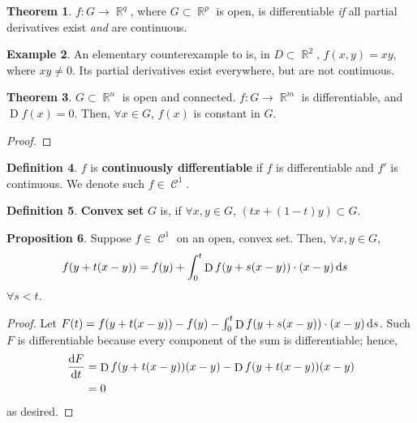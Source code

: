 \documentclass{amsart} %
\theoremstyle{mytheoremstyle}
\theoremstyle{definition}
\newtheorem{definition}{Definition}[section]
\newtheorem{proposition}[definition]{Proposition}
\newtheorem{theorem}[definition]{Theorem}
\newtheorem{example}[definition]{Example}
\numberwithin{equation}{section}
\DeclareMathOperator{\R}{\mathbb{R}}
\DeclareMathOperator{\1}{\mathbbm{1}}
\DeclareMathOperator{\DD}{D}
\DeclareMathOperator{\contf}{\mathcal{C}}
\begin{document}
\begin{theorem}
	\label{thmfdiffifcontinuousexists}
	$f:G \to \R^q$, where $G \subset \R^p$ is open, is differentiable \textit{if} all partial derivatives exist \textit{and} are continuous.
\end{theorem}

\begin{example}
	An elementary counterexample to  is, in $D \subset \R^2$, $f(x,y) = xy$, where $xy \neq 0$. Its partial derivatives exist everywhere, but are not continuous. 
\end{example}

\begin{theorem}
	$G \subset \R^n $ is open and connected. $f : G \to \R^m$ is differentiable, and $\DD f(x) = 0$. Then, $\forall x \in G$, $f(x)$ is constant in $G$.
\end{theorem}

\begin{proof}
	
\end{proof}

\begin{definition}
	$f$ is \textbf{continuously differentiable} if $f$ is differentiable and $f'$ is continuous. We denote such $f \in \contf^1$.
\end{definition}

\begin{definition}
	\textbf{Convex set} $G$ is, if $\forall x,y \in G$, $(tx +(1-t)y) \subset G$.
\end{definition}

\begin{proposition}
	\label{propwritingconvexsetfunctions}
	Suppose $f \in \contf^1$ on an open, convex set. Then, $\forall x,y \in G$,
	\begin{align*}
	f(y + t(x-y) ) &= f(y) + \int_{0}^{t} \DD f(y+s(x-y)) \cdot (x-y) \dif s 
	\end{align*}
	$\forall s < t$.
\end{proposition}

\begin{proof}
	Let $F(t) = f(y + t(x-y) ) - f(y) - \int_{0}^{t} \DD f(y+s(x-y)) \cdot (x-y) \dif s $. Such $F$ is differentiable because every component of the sum is differentiable; hence,
	\begin{align*}
	\frac{\dif F}{\dif t} &= \DD f(y + t(x-y) ) (x-y) - \DD f(y+t(x-y)) (x-y) \\
	&=0
	\end{align*}
	as desired. 
\end{proof}
\end{document}
